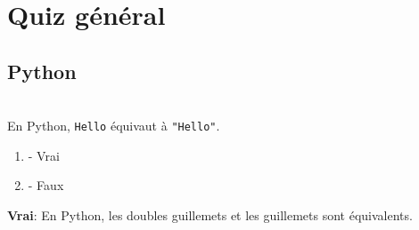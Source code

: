   
    
\section{Quiz général}

\subsection{Python}

\begin{Exercice}[2 minutes]\\
En Python, \texttt{\textquotesingle Hello\textquotesingle} équivaut à \texttt{"Hello"}. 

\begin{enumerate}
    \item - Vrai
    \item - Faux
\end{enumerate}
\begin{solution}
    \textbf{Vrai}: En Python, les doubles guillemets et les guillemets sont équivalents. 
\end{solution}
\end{Exercice}


